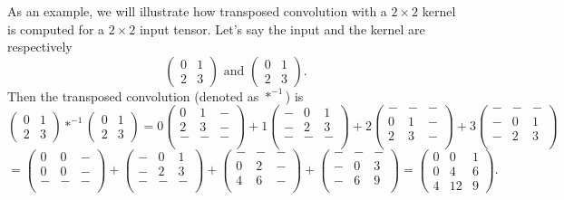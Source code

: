 As an example, we will illustrate how transposed convolution with a $2\times 2$ kernel is computed for a $2\times 2$ input tensor. Let's say the input and the kernel are respectively $$\begin{pmatrix}
0 & 1 \\ 2 & 3
\end{pmatrix} \text{ and } \begin{pmatrix}
0 & 1 \\ 2 & 3
\end{pmatrix}.$$
Then the transposed convolution (denoted as $*^{-1}$) is
$$
\begin{pmatrix}
0 & 1 \\ 2 & 3
\end{pmatrix} *^{-1} \begin{pmatrix}
0 & 1 \\ 2 & 3
\end{pmatrix}
=
0 
\begin{pmatrix}
0 & 1 & - \\
2 & 3 & - \\
- & - & - \\
\end{pmatrix} +
1 
\begin{pmatrix}
- & 0 & 1 \\
- & 2 & 3 \\
- & - & - \\
\end{pmatrix} +
2 
\begin{pmatrix}
- & - & - \\
0 & 1 & - \\
2 & 3 & - \\
\end{pmatrix} +
3
\begin{pmatrix}
- & - & - \\
- & 0 & 1 \\
- & 2 & 3 \\
\end{pmatrix}
$$
$$
=\begin{pmatrix}
0 & 0 & - \\
0 & 0 & - \\
- & - & - \\
\end{pmatrix} +
\begin{pmatrix}
- & 0 & 1 \\
- & 2 & 3 \\
- & - & - \\
\end{pmatrix} +
\begin{pmatrix}
- & - & - \\
0 & 2 & - \\
4 & 6 & - \\
\end{pmatrix} +
\begin{pmatrix}
- & - & - \\
- & 0 & 3 \\
- & 6 & 9 \\
\end{pmatrix} =
\begin{pmatrix}
0 & 0 & 1 \\
0 & 4 & 6 \\
4 & 12 & 9
\end{pmatrix}.
$$

